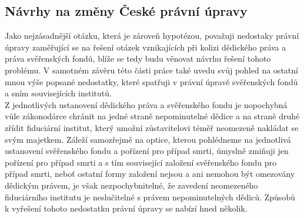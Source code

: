 \documentclass{article}
\begin{document}








\subsection{Návrhy na změny České právní úpravy}

Jako nejzásadnější otázku, která je zároveň hypotézou, považuji nedostaky právní úpravy zaměřující se na řešení otázek vznikajících při kolizi dědického práva a práva svěřenských fondů, blíže se tedy budu věnovat návrhu řešení tohoto problému. V samotném závěru této části práce také uvedu svůj pohled na ostatní mnou výše popsané nedostatky, které spatřuji v právní úpravě svěřenských fondů a sním souvisejících institutů.\\

Z jednotlivých ustanovení dědického práva a svěřenského fondu je nopochybná vůle zákonodárce chránit na jedné straně nepominutelné dědice a na straně druhé zřídit fiduciární institut, který umožní zůstavitelovi téměř neomezeně nakládat se svým majetkem. Záleží samozřejmě na optice, kterou pohlédneme na jednotlivá ustanovení svěřenského fondu a pořízení pro případ smrti, úmyslně zmiňuji jen pořízení pro případ smrti a s tím související založení svěřenského fondu pro případ smrti, neboť ostatní formy založení nejsou a ani nemohou být omezovány dědickým právem, je však nezpochybnitelné, že zavedení neomezeného fiduciárního institutu je neslučitelné s právem nepominutelných dědiců. Způsobů k vyřešení tohoto nedostatku právní úpravy se nabízí hned několik.\\
\end{document}
